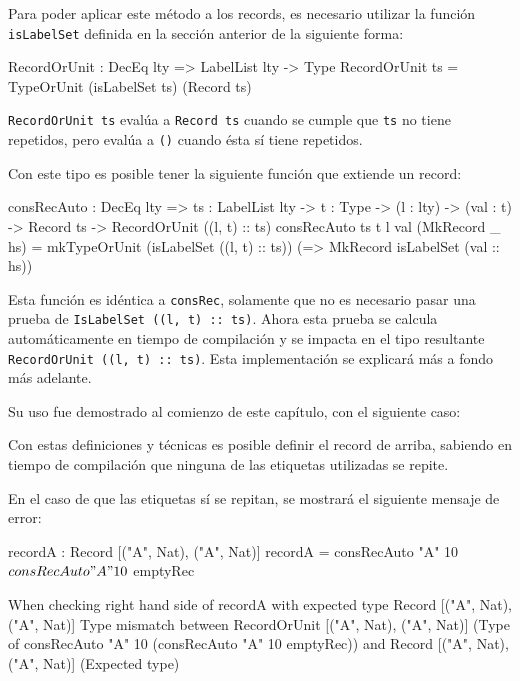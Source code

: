 Para poder aplicar este método a los records, es necesario utilizar la función \texttt{isLabelSet} definida en la sección anterior de la siguiente forma:

\begin{code}
RecordOrUnit : DecEq lty => LabelList lty -> Type
RecordOrUnit ts = TypeOrUnit (isLabelSet ts) (Record ts)
\end{code}

\texttt{RecordOrUnit ts} evalúa a \texttt{Record ts} cuando se cumple que \texttt{ts} no tiene repetidos, pero evalúa a \texttt{()} cuando ésta sí tiene repetidos.

Con este tipo es posible tener la siguiente función que extiende un record:

\begin{code}
consRecAuto : DecEq lty => {ts : LabelList lty} ->
  {t : Type} -> (l : lty) -> (val : t) -> Record ts ->
  RecordOrUnit ((l, t) :: ts)
consRecAuto {ts} {t} l val (MkRecord _ hs) =
  mkTypeOrUnit (isLabelSet ((l, t) :: ts))
  (\isLabelSet => MkRecord isLabelSet (val :: hs))
\end{code}

Esta función es idéntica a \texttt{consRec}, solamente que no es necesario pasar una prueba de \texttt{IsLabelSet ((l, t) :: ts)}. Ahora esta prueba se calcula automáticamente en tiempo de compilación y se impacta en el tipo resultante \texttt{RecordOrUnit ((l, t) :: ts)}. Esta implementación se explicará más a fondo más adelante.

Su uso fue demostrado al comienzo de este capítulo, con el siguiente caso:


Con estas definiciones y técnicas es posible definir el record de arriba, sabiendo en tiempo de compilación que ninguna de las etiquetas utilizadas se repite.

En el caso de que las etiquetas sí se repitan, se mostrará el siguiente mensaje de error:

\begin{code}
recordA : Record [("A", Nat), ("A", Nat)]
recordA = consRecAuto "A" 10 $
  consRecAuto "A" 10 $
  emptyRec

When checking right hand side of recordA with expected type
    Record [("A", Nat), ("A", Nat)]
  Type mismatch between
    RecordOrUnit [("A", Nat), ("A", Nat)]
      (Type of consRecAuto "A" 10
        (consRecAuto "A" 10 emptyRec))
  and
    Record [("A", Nat), ("A", Nat)] (Expected type)
\end{code}

